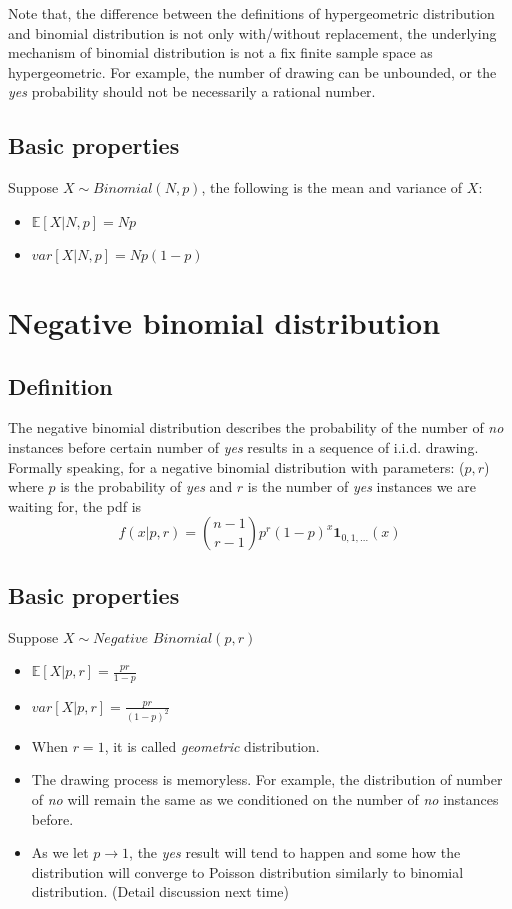 \documentclass[11pt]{article}
\begin{document}
Note that, the difference between the definitions of hypergeometric distribution and binomial distribution is not only with/without replacement, the underlying mechanism of binomial distribution is not a fix finite sample space as hypergeometric. For example, the number of drawing can be unbounded, or the {\it yes} probability should not be necessarily a rational number.

\subsection{Basic properties}
Suppose $X\sim\textit{Binomial}(N,p)$, the following is the mean and variance of $X$:
\begin{itemize}
	\item $\mathbb{E}[X|N,p] = Np$
	\item $var[X|N,p] = Np(1-p)$
\end{itemize}

\section{Negative binomial distribution}
\subsection{Definition}
The negative binomial distribution describes the probability of the number of {\it no} instances before certain number of {\it yes} results in a sequence of i.i.d. drawing. Formally speaking, for a negative binomial distribution with parameters: ($p,r$) where $p$ is the probability of {\it yes} and $r$ is the number of {\it yes} instances we are waiting for, the pdf is
$$f(x|p,r) = {n-1\choose r-1}p^r(1-p)^x\mathbf{1}_{0,1,...}(x)$$

\subsection{Basic properties}
Suppose $X\sim\textit{Negative Binomial}(p,r)$
\begin{itemize}
	\item $\mathbb{E}[X|p,r] = \frac{pr}{1-p}$
	\item $var[X|p,r]=\frac{pr}{(1-p)^2}$
	\item When $r=1$, it is called {\it geometric} distribution.
	\item The drawing process is memoryless. For example, the distribution of number of {\it no} will remain the same as we conditioned on the number of {\it no} instances before.
	\item As we let $p\rightarrow1$, the {\it yes} result will tend to happen and some how the distribution will converge to Poisson distribution similarly to binomial distribution. (Detail discussion next time)
\end{itemize}
\end{document}
